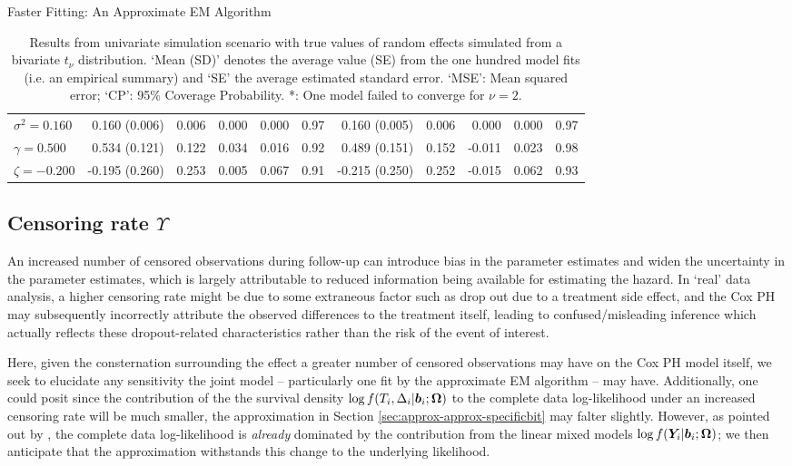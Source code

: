 \begin{chapter}{\label{cha:approx}Faster Fitting: An Approximate EM Algorithm}
\begin{table}[t]
\begin{tabular}{l|rrrrr:rrrrr}
    $\sigma^2 = 0.160$ &  0.160 (0.006) & 0.006 &  0.000 & 0.000 & 0.97 &  0.160 (0.005) & 0.006 &  0.000 & 0.000 & 0.97 \\ 
    $\gamma = 0.500$ &  0.534 (0.121) & 0.122 &  0.034 & 0.016 & 0.92 &  0.489 (0.151) & 0.152 & -0.011 & 0.023 & 0.98 \\ 
    $\zeta = -0.200$ & -0.195 (0.260) & 0.253 &  0.005 & 0.067 & 0.91 & -0.215 (0.250) & 0.252 & -0.015 & 0.062 & 0.93 \\ 
     \hline
  \end{tabular}
  \caption{Results from univariate simulation scenario with true values of random effects simulated from a bivariate $t_\nu$ distribution. `Mean (SD)' denotes the average value (SE) from the one hundred model fits (i.e. an empirical summary) and `SE' the average estimated standard error. `MSE': Mean squared error; `CP': 95\% Coverage Probability. *: One model failed to converge for $\nu=2$.}
  \label{tab:approx-sens-t-results}
  \end{table}

  \subsection{Censoring rate \texorpdfstring{$\Upsilon$}{censrate}}\label{sec:approx-sens-C}
  An increased number of censored observations during follow-up can introduce bias in the parameter estimates and widen the uncertainty in the parameter estimates, which is largely attributable to reduced information being available for estimating the hazard. In `real' data analysis, a higher censoring rate might be due to some extraneous factor such as drop out due to a treatment side effect, and the Cox PH may subsequently incorrectly attribute the observed differences to the treatment itself, leading to confused/misleading inference which actually reflects these dropout-related characteristics rather than the risk of the event of interest.

  Here, given the consternation surrounding the effect a greater number of censored observations may have on the Cox PH model itself, we seek to elucidate any sensitivity the joint model -- particularly one fit by the approximate EM algorithm -- may have. Additionally, one could posit since the contribution of the the survival density $\log f\!\left( T_i,\Delta_i|\bm{b}_i;\bm{\mathrm{\Omega}}\right)$ to the complete data log-likelihood under an increased censoring rate will be much smaller, the approximation in Section \ref{sec:approx-approx-specificbit} may falter slightly. However, as pointed out by \citet{Rizopoulos2012}, the complete data log-likelihood is \textit{already} dominated by the contribution from the linear mixed models $\log f\!\left(\bm{Y}_i|\bm{b}_i;\bm{\mathrm{\Omega}}\right)$; we then anticipate that the approximation withstands this change to the underlying likelihood.


\end{chapter}
